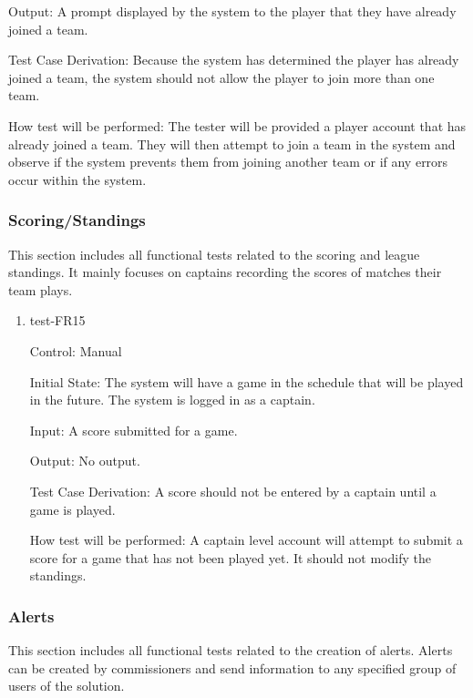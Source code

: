 \documentclass[12pt, titlepage]{article}
\begin{document}
\begin{enumerate}
  Output: A prompt displayed by the system to the player that they have already joined
  a team.

  Test Case Derivation: Because the system has determined the player has already joined a
  team, the system should not allow the player to join more than one team.
            
  How test will be performed: The tester will be provided a player account that has already
  joined a team. They will then attempt to join a team in the system and observe if the
  system prevents them from joining another team or if any errors occur within the system.

\end{enumerate}

\subsubsection{Scoring/Standings}

This section includes all functional tests related to the scoring and
league standings. It mainly focuses on captains recording the scores of
matches their team plays.

\begin{enumerate}

  \item{test-FR15\\}

  Control: Manual

  Initial State: The system will have a game in the schedule that will be played
  in the future. The system is logged in as a captain.
            
  Input: A score submitted for a game.

  Output: No output.

  Test Case Derivation: A score should not be entered by a captain until a game
  is played.

  How test will be performed: A captain level account will attempt to submit a
  score for a game that has not been played yet. It should not modify the
  standings.

\end{enumerate}

\subsubsection{Alerts}

This section includes all functional tests related to the creation of alerts.
Alerts can be created by commissioners and send information to any specified
group of users of the solution.
\end{document}
